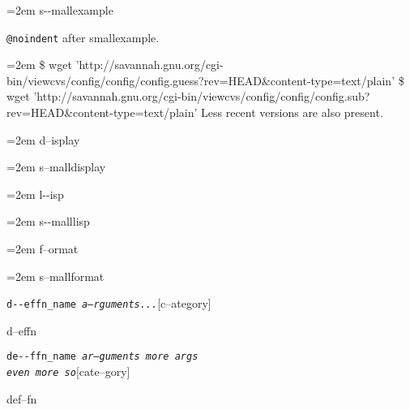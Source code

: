 \documentclass{book}
\begin{document}
\begin{titlepage}
\par\begingroup\obeylines\obeyspaces\frenchspacing\leftskip=2em\relax\parskip=0pt\relax\ttfamily\footnotesize{}%
s{-}{-}mallexample
\endgroup{}%

\texttt{@noindent} after smallexample.
\par\begingroup\obeylines\obeyspaces\frenchspacing\leftskip=2em\relax\parskip=0pt\relax\ttfamily\footnotesize{}%
\$ wget 'http://savannah.gnu.org/cgi-bin/viewcvs/config/config/config.guess?rev=HEAD\&content-type=text/plain'
\$ wget 'http://savannah.gnu.org/cgi-bin/viewcvs/config/config/config.sub?rev=HEAD\&content-type=text/plain'
\endgroup{}%
\noindent{}Less recent versions are also present.

\par\begingroup\obeylines\obeyspaces\frenchspacing\leftskip=2em\relax\parskip=0pt\relax{}%
d--isplay
\endgroup{}%

\par\begingroup\obeylines\obeyspaces\frenchspacing\leftskip=2em\relax\parskip=0pt\relax\footnotesize{}%
s--malldisplay
\endgroup{}%

\par\begingroup\obeylines\obeyspaces\frenchspacing\leftskip=2em\relax\parskip=0pt\relax\ttfamily{}%
l{-}{-}isp
\endgroup{}%

\par\begingroup\obeylines\obeyspaces\frenchspacing\leftskip=2em\relax\parskip=0pt\relax\ttfamily\footnotesize{}%
s{-}{-}malllisp
\endgroup{}%

\par\begingroup\obeylines\obeyspaces\frenchspacing\leftskip=2em\relax\parskip=0pt\relax{}%
f--ormat
\endgroup{}%

\par\begingroup\obeylines\obeyspaces\frenchspacing\leftskip=2em\relax\parskip=0pt\relax\footnotesize{}%
s--mallformat
\endgroup{}%

\noindent\texttt{d{-}{-}effn\_name \bgroup{}\normalfont{}\textsl{a--rguments...}\egroup{}}\hfill[c--ategory]



%
d--effn

\noindent\texttt{de{-}{-}ffn\_name \bgroup{}\normalfont{}\textsl{ar--guments    more args \leavevmode{}\\ even more so}\egroup{}}\hfill[cate--gory]



%
def--fn


\end{titlepage}
\end{document}
